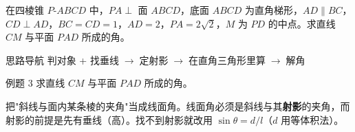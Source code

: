 \documentclass{exam-zh}
\begin{document}
\begin{eduProblemBlock}[例题 3]
在四棱锥 $P\text{-}ABCD$ 中，$PA\perp$ 面 $ABCD$，底面 $ABCD$ 为直角梯形，$AD\parallel BC$，$CD\perp AD$，$BC=CD=1$，$AD=2$，$PA=2\sqrt2$，$M$ 为 $PD$ 的中点。求直线 $CM$ 与平面 $PAD$ 所成的角。
\end{eduProblemBlock}





\begin{eduAuxItem}{思路导航}
判对象 + 找垂线$\;\to\;$定射影$\;\to\;$在直角三角形里算$\;\to\;$解角\end{eduAuxItem}




\begin{eduSubQuestionItem}{例题 3}
求直线 $CM$ 与平面 $PAD$ 所成的角。\end{eduSubQuestionItem}

\begin{eduDualExplain}
  \begin{eduExplainLeft}
  \end{eduExplainLeft}

  \begin{eduExplainRight}
  \end{eduExplainRight}
\end{eduDualExplain}




\begin{eduMistakeBox}
把"斜线与面内某条棱的夹角"当成线面角。线面角必须是斜线与其\textbf{射影}的夹角，而射影的前提是先有垂线（高）。找不到射影就改用 $\sin\theta=d/l$（$d$ 用等体积法）。\end{eduMistakeBox}
\end{document}
